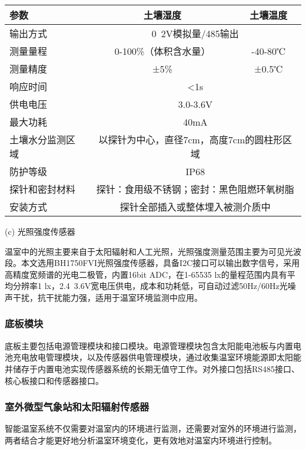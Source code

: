 		\begin{table}[!htbp]
  			\centering
  			\begin{tabular}{lcc} \toprule
    		参数 & 土壤湿度 & 土壤温度 \\ \midrule
    		输出方式 & \multicolumn{2}{c}{0~2V模拟量/485输出} \\
    		测量量程 & 0-100\%（体积含水量） & -40-80℃\\
			测量精度 & ±5\% & ±0.5℃\\
    		响应时间 & \multicolumn{2}{c}{<1s} \\
    		供电电压 & \multicolumn{2}{c}{3.0-3.6V} \\
    		最大功耗 & \multicolumn{2}{c}{40mA} \\
    		土壤水分监测区域 & \multicolumn{2}{c}{以探针为中心，直径7cm，高度7cm的圆柱形区域} \\
    		防护等级 & \multicolumn{2}{c}{IP68} \\
    		探针和密封材料 & \multicolumn{2}{c}{探针：食用级不锈钢；密封：黑色阻燃环氧树脂} \\
    		安装方式 & \multicolumn{2}{c}{探针全部插入或整体埋入被测介质中} \\ \bottomrule
 			\end{tabular}
		\end{table}
		(c) 光照强度传感器
		
温室中的光照主要来自于太阳辐射和人工光照，光照强度测量范围主要为可见光波段。本文选用BH1750FVI光照强度传感器，具备I2C接口可以输出数字信号，采用高精度宽频谱的光电二极管，内置16bit ADC，在1-65535 lx的量程范围内具有平均分辨率1 lx，2.4~3.6V宽电压供电，成本和功耗低，可自动过滤50Hz/60Hz光噪声干扰，抗干扰能力强，适用于温室环境监测中应用。

		\subsubsection{底板模块}
		底板主要包括电源管理模块和接口模块。电源管理模块包含太阳能电池板与内置电池充电放电管理模块，以及传感器供电管理模块，通过收集温室环境能源即太阳能并储存于内置电池实现传感器系统的长期无值守工作。对外接口包括RS485接口、核心板接口和传感器接口。	
		
		\subsubsection{室外微型气象站和太阳辐射传感器}
		智能温室系统不仅需要对温室内的环境进行监测，还需要对室外的环境进行监测，两者结合才能更好地分析温室环境变化，更有效地对温室内环境进行控制。
		
